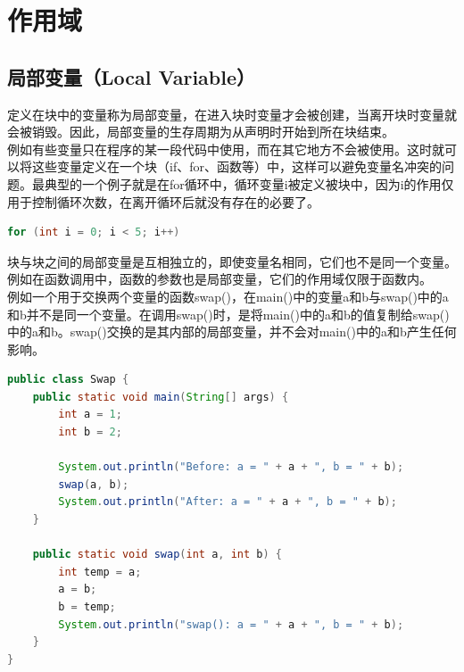 \newpage

\section{作用域}

\subsection{局部变量（Local Variable）}

定义在块中的变量称为局部变量，在进入块时变量才会被创建，当离开块时变量就会被销毁。因此，局部变量的生存周期为从声明时开始到所在块结束。\\

例如有些变量只在程序的某一段代码中使用，而在其它地方不会被使用。这时就可以将这些变量定义在一个块（if、for、函数等）中，这样可以避免变量名冲突的问题。最典型的一个例子就是在for循环中，循环变量i被定义被块中，因为i的作用仅用于控制循环次数，在离开循环后就没有存在的必要了。

\vspace{-0.5cm}

\begin{lstlisting}[language=Java]
for (int i = 0; i < 5; i++)
\end{lstlisting}

块与块之间的局部变量是互相独立的，即使变量名相同，它们也不是同一个变量。\\

例如在函数调用中，函数的参数也是局部变量，它们的作用域仅限于函数内。\\

例如一个用于交换两个变量的函数swap()，在main()中的变量a和b与swap()中的a和b并不是同一个变量。在调用swap()时，是将main()中的a和b的值复制给swap()中的a和b。swap()交换的是其内部的局部变量，并不会对main()中的a和b产生任何影响。\\


\begin{lstlisting}[language=Java]
public class Swap {
	public static void main(String[] args) {
		int a = 1;
		int b = 2;

		System.out.println("Before: a = " + a + ", b = " + b);
		swap(a, b);
		System.out.println("After: a = " + a + ", b = " + b);
	}

	public static void swap(int a, int b) {
		int temp = a;
		a = b;
		b = temp;
		System.out.println("swap(): a = " + a + ", b = " + b);
	}
}
\end{lstlisting}

